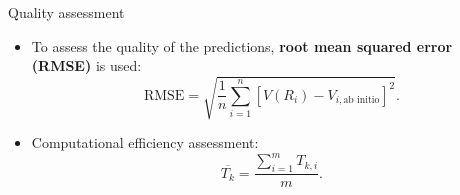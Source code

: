 \documentclass{beamer}
\def\D{\displaystyle}
\begin{document}
\begin{frame}{Quality assessment}
    \begin{itemize}
        \item To assess the quality of the predictions, \textbf{root mean squared error (RMSE)} is used:
        \begin{equation}
            \text{RMSE} = \sqrt{\frac{1}{n}\sum_{i=1}^n \left[V(R_i) - V_{i,\text{ab initio}}\right]^2}.
            \label{eq:rmse}
        \end{equation}
        \item Computational efficiency assessment:
        \begin{equation}
            \overline{T_k} = \D\frac{\D\sum_{i=1}^m T_{k,i}}{m}.
            \label{eq:efficiency}
        \end{equation}
    \end{itemize}
\end{frame}
\end{document}

